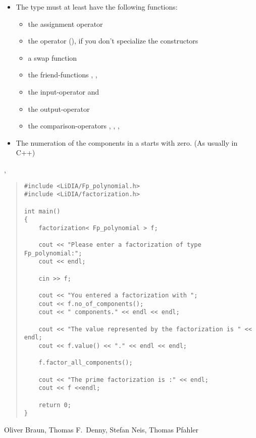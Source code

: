 
\NOTES

\begin{itemize}
\item The type  must at least have the following functions:
  \begin{itemize}
  \item the assignment operator \code{=}
  \item the operator \code{=} (), if you don't specialize the constructors
  \item a swap function 
  \item the friend-functions , , 
  \item the input-operator \code{>>} and
  \item the output-operator \code{<<}
  \item the comparison-operators \code{<}, \code{<=}, \code{==}, \code{!=}
  \end{itemize}
\item The numeration of the components in a 
  starts with zero.  (As usually in C++)
\end{itemize}



\SEEALSO

, 



\EXAMPLES

\begin{quote}
\begin{verbatim}
#include <LiDIA/Fp_polynomial.h>
#include <LiDIA/factorization.h>

int main()
{
    factorization< Fp_polynomial > f;

    cout << "Please enter a factorization of type Fp_polynomial:";
    cout << endl;

    cin >> f;

    cout << "You entered a factorization with ";
    cout << f.no_of_components();
    cout << " components." << endl << endl;

    cout << "The value represented by the factorization is " << endl;
    cout << f.value() << "." << endl << endl;

    f.factor_all_components();

    cout << "The prime factorization is :" << endl;
    cout << f <<endl;

    return 0;
}
\end{verbatim}
\end{quote}



\AUTHOR
Oliver Braun, Thomas F.~Denny,
Stefan Neis, Thomas Pfahler
